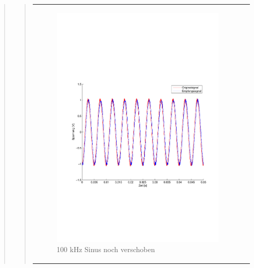 \begin{quote}
\begin{quote}
\begin{center}
\begin{tabular}{ll}
            \hspace{-4cm}
                \begin{minipage}{0.6\textwidth}
                    \begin{figure}[H]
                        \includegraphics[scale=0.5, trim = 16mm 70mm 16mm 85mm, clip]
                                        {Bilder/100kHz_sin_Signal_Rekonstuiert}
                          \caption{100 kHz Sinus noch verschoben}
                          \label{fig:100kHz_sin_rek}
                    \end{figure}
                \end{minipage}
                

\end{tabular}
\end{center}
\end{quote}
\end{quote}
